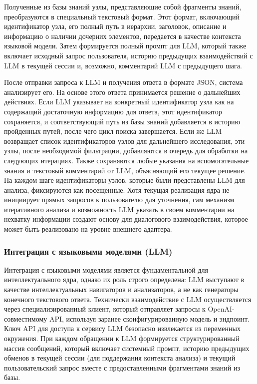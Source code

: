 Полученные из базы знаний узлы, представляющие собой фрагменты знаний, преобразуются в специальный текстовый формат. Этот формат, включающий идентификатор узла, его полный путь в иерархии, заголовок, описание и информацию о наличии дочерних элементов, передается в качестве контекста языковой модели. Затем формируется полный промпт для LLM, который также включает исходный запрос пользователя, историю предыдущих взаимодействий с LLM в текущей сессии и, возможно, комментарий LLM с предыдущего шага.

После отправки запроса к LLM и получения ответа в формате JSON\cite{json}, система анализирует его. На основе этого ответа принимается решение о дальнейших действиях. Если LLM указывает на конкретный идентификатор узла как на содержащий достаточную информацию для ответа, этот идентификатор сохраняется, и соответствующий путь из базы знаний добавляется в историю пройденных путей, после чего цикл поиска завершается. Если же LLM возвращает список идентификаторов узлов для дальнейшего исследования, эти узлы, после необходимой фильтрации, добавляются в очередь для обработки на следующих итерациях. Также сохраняются любые указания на вспомогательные знания и текстовый комментарий от LLM, объясняющий его текущее решение. На каждом шаге идентификаторы узлов, которые были представлены LLM для анализа, фиксируются как посещенные. Хотя текущая реализация ядра не инициирует прямых запросов к пользователю для уточнения, сам механизм итеративного анализа и возможность LLM указать в своем комментарии на нехватку информации создают основу для диалогового взаимодействия, которое может быть реализовано на уровне внешнего адаптера.

\subsubsection{Интеграция с языковыми моделями (LLM)}

Интеграция с языковыми моделями является фундаментальной для интеллектуального ядра, однако их роль строго определена: LLM выступают в качестве интеллектуальных навигаторов и анализаторов, а не как генераторы конечного текстового ответа. Технически взаимодействие с LLM осуществляется через специализированный клиент, который отправляет запросы к OpenAI-совместимому API, используя заранее сконфигурированную модель и эндпоинт. Ключ API для доступа к сервису LLM безопасно извлекается из переменных окружения. При каждом обращении к LLM формируется структурированный массив сообщений, который включает системный промпт, историю предыдущих обменов в текущей сессии (для поддержания контекста анализа) и текущий пользовательский запрос вместе с предоставленными фрагментами знаний из базы.


